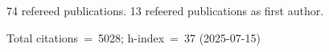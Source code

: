74 refereed publications. 13 refeered publications as first author.

Total citations~=~5028; h-index~=~37 (2025-07-15)
